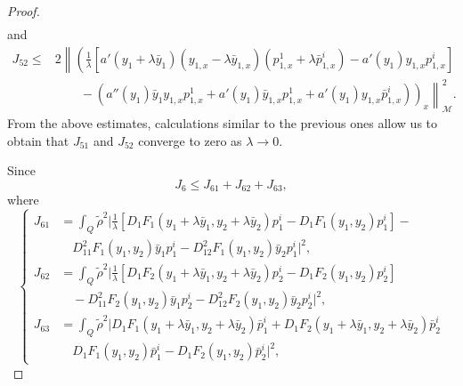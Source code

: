 \documentclass[11pt,a4paper]{amsart}
\numberwithin{equation}{section}
\begin{document}
\begin{proof}
\begin{equation*}
\begin{split}
        \end{split}
    \end{equation*}
    and
    \begin{equation*}
        \begin{split}
            J_{52} \leq &2\left\| \left( \frac{1}{\lambda} \left[ a'(y_1+\lambda\bar y_1)(y_{1,x}-\lambda\bar y_{1,x})(p^1_{1,x}+\lambda\bar p^i_{1,x} ) - a'(y_1)y_{1,x}p^i_{1,x} \right] \right.\right. \\
            &\left.\left. \qquad - (a''(y_1)\bar y_1 y_{1,x} p^1_{1,x} + a'(y_1)\bar y_{1,x} p^1_{1,x} + a'(y_1)y_{1,x}\bar p^i_{1,x}) \right)_x\right\|^{2}_{\mathcal{M}}.
        \end{split}
    \end{equation*}From the above estimates, calculations similar to the previous ones allow us to obtain that $J_{51}$ and $J_{52}$ converge to zero as $\lambda \to 0$.

    \noindent Since 
    \begin{equation*}
    J_6 \leq     J_{61} + J_{62} + J_{63},
    \end{equation*}where
    \begin{equation*}
    \begin{cases}
    J_{61} &= \displaystyle \int_Q \tilde\rho^2 \Big| \frac{1}{\lambda}\left[D_1 F_1(y_1+\lambda \bar y_1,y_2+\lambda \bar y_2) p^i_1 - D_1 F_1(y_1,y_2) p^i_1 \right] - \\
   & \quad D_{11}^2 F_1(y_1,y_2)\bar y_1 p^i_1 - D_{12}^2 F_1(y_1,y_2)\bar y_2 p^i_1\Big|^2, \\
   J_{62} &= \displaystyle \int_Q \tilde\rho^2 \Big| \frac{1}{\lambda}\left[ D_1 F_2(y_1+\lambda \bar y_1,y_2+\lambda \bar y_2) p^i_2  - D_1 F_2(y_1,y_2) p^i_2 \right] \\
   & \quad - D_{11}^2 F_2(y_1,y_2)\bar y_1 p^i_2 - D_{12}^2 F_2(y_1,y_2)\bar y_2 p^i_2 \Big|^2,\\
   J_{63} &= \displaystyle \int_Q \tilde\rho^2 \Big| D_1 F_1(y_1+\lambda \bar y_1,y_2+\lambda \bar y_2) \bar p^i_1 + D_1 F_2(y_1+\lambda \bar y_1,y_2+\lambda \bar y_2) \bar p^i_2 \\
   & \quad D_1 F_1(y_1,y_2) \bar p^i_1 - D_1 F_2(y_1,y_2) \bar p^i_2 \Big|^2,
    \end{cases}
    \end{equation*}
    

\end{proof}
\end{document}
